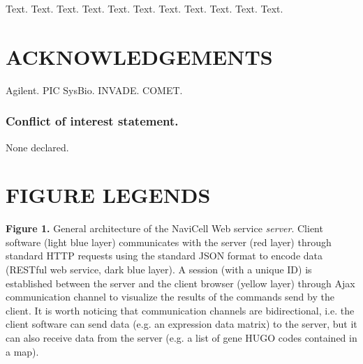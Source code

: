 \documentclass[a4,center,fleqn]{NAR}
\begin{document}
Text. Text. Text. Text. Text. Text. Text. Text. Text. Text. Text.

\section{ACKNOWLEDGEMENTS}


Agilent. PIC SysBio. INVADE. COMET.

\subsubsection{Conflict of interest statement.} None declared.
\newpage



\section{FIGURE LEGENDS}

\textbf{Figure 1.} General architecture of the NaviCell Web service
\emph{server}. Client software (light blue layer) communicates with the server
(red layer) through standard HTTP requests using the standard JSON format to
encode data (RESTful web service, dark blue layer). A session (with a unique ID)
is established between the server and the client browser (yellow layer) through
Ajax communication channel to visualize the results of the commands send by the
client. It is worth noticing that communication channels are bidirectional, i.e.
the client software can send data (e.g. an expression data matrix) to the
server, but it can also receive data from the server (e.g. a list of gene HUGO
codes contained in a map).
\end{document}

